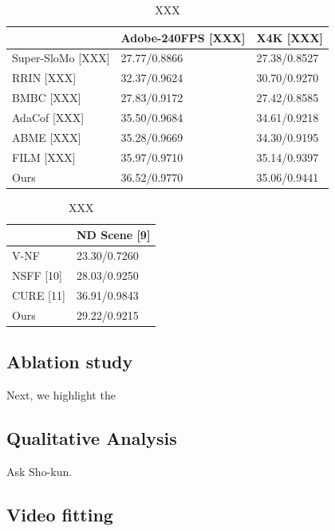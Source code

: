 \documentclass{article}
\begin{document}
\begin{table}[]
\caption{XXX}
\begin{tabular}{l | l | l }
 &  Adobe-240FPS  [XXX] &  X4K [XXX]  \\
\hline
Super-SloMo [XXX] &  27.77/0.8866 & 27.38/0.8527  \\
RRIN [XXX]  & 32.37/0.9624 & 30.70/0.9270  \\
BMBC [XXX]  & 27.83/0.9172 & 27.42/0.8585   \\
AdaCof [XXX] & 35.50/0.9684 & 34.61/0.9218 \\
ABME   [XXX] & 35.28/0.9669 & 34.30/0.9195 \\
FILM   [XXX] &	35.97/0.9710 & 35.14/0.9397 \\
Ours	& 36.52/0.9770 & 35.06/0.9441 \\
\end{tabular}

\end{table}

	

\begin{table}[]
\caption{XXX}
\begin{tabular}{l | l }
	    &   ND Scene [9] \\
\hline
V-NF        &  23.30/0.7260\\
NSFF [10]   & 28.03/0.9250\\
CURE [11]   & 36.91/0.9843\\
Ours	    &  29.22/0.9215
\end{tabular}

\end{table}



\subsection{Ablation study}

Next, we highlight the 



\subsection{Qualitative Analysis}

% 
Ask Sho-kun.

\subsection{Video fitting}
\end{document}
